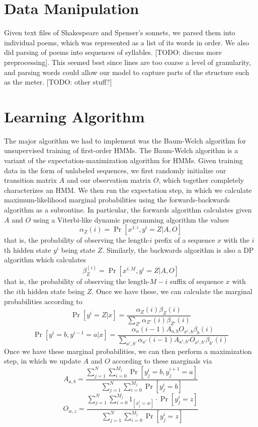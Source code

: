 \section{Data Manipulation}
Given text files of Shakespeare and Spenser's sonnets, we parsed them into individual poems, which was represented as a list of its words in order. We also did parsing of poems into sequences of syllables. [TODO: discuss more preprocessing]. This seemed best since lines are too coarse a level of granularity, and parsing words could allow our model to capture parts of the structure such as the meter. [TODO: other stuff?]

\section{Learning Algorithm}
The major algorithm we had to implement was the Baum-Welch algorithm for unsupervised training of first-order HMMs. The Baum-Welch algorithm is a variant of the expectation-maximization algorithm for HMMs. Given training data in the form of unlabeled sequences, we first randomly initialize our transition matrix $A$ and our observation matrix $O$, which together completely characterizes an HMM. We then run the expectation step, in which we calculate maximum-likelihood marginal probabilities using the forwards-backwards algorithm as a subroutine. In particular, the forwards algorithm calculates given $A$ and $O$ using a Viterbi-like dynamic programming algorithm the values
$$\alpha_Z(i) = \Pr[x^{1 : i}, y^i = Z | A, O]$$
that is, the probability of observing the length-$i$ prefix of a sequence $x$ with the $i$th hidden state $y^i$ being state $Z$. Similarly, the backwards algorithm is also a DP algorithm which calculates
$$\beta_Z^(i) = \Pr[x^{i : M}, y^i = Z | A, O]$$
that is, the probability of observing the length-$M - i$ suffix of sequence $x$ with the $i$th hidden state being $Z$.
Once we have these, we can calculate the marginal probabilities according to
$$\Pr[y^i = Z | x] = \frac{\alpha_Z(i)\beta_Z(i)}{\sum_{Z'}{\alpha_{Z'}(i)\beta_{Z'}(i)}}$$
$$\Pr[y^i = b, y^{i - 1} = a | x] = \frac{\alpha_a(i - 1)A_{a, b}O_{x^i, b}\beta_b(i)}{\sum_{a', b'}{\alpha_{a'}(i - 1)A_{a', b'}O_{x^i, b'}\beta_{b'}(i)}}$$
Once we have these marginal probabilities, we can then perform a maximization step, in which we update $A$ and $O$ according to these marginals via
$$A_{a, b} = \frac{\sum_{j = 1}^{N}{\sum_{i = 0}^{M_j}{\Pr[y_j^i = b, y_j^{i + 1} = a]}}}{\sum_{j = 1}^{N}{\sum_{i = 0}^{M_j}{\Pr[y_j^i = b]}}}$$
$$O_{w, z} = \frac{\sum_{j = 1}^{N}{\sum_{i = 0}^{M_j}{1_{[x_j^i = w]} \cdot \Pr[y_j^i = z]}}}{\sum_{j = 1}^{N}{\sum_{i = 0}^{M_j}{\Pr[y_j^i = z]}}}$$
